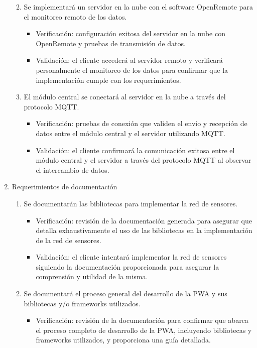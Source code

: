 \documentclass[
11pt, %
]{charter}
\begin{document}
\begin{enumerate}
\begin{enumerate}
\begin{itemize}
			\end{itemize}
			\item Se implementará un servidor en la nube con el software OpenRemote para el monitoreo remoto de los datos.
			\begin{itemize}
				\item Verificación: configuración exitosa del servidor en la nube con OpenRemote y pruebas de transmisión de datos.
				\item Validación: el cliente accederá al servidor remoto y verificará personalmente el monitoreo de los datos para confirmar que la implementación cumple con los requerimientos.
			\end{itemize}
			\item El módulo central se conectará al servidor en la nube a través del protocolo MQTT.
			\begin{itemize}
				\item Verificación: pruebas de conexión que validen el envío y recepción de datos entre el módulo central y el servidor utilizando MQTT.
				\item Validación: el cliente confirmará la comunicación exitosa entre el módulo central y el servidor a través del protocolo MQTT al observar el intercambio de datos.
			\end{itemize}
		\end{enumerate}
	\item Requerimientos de documentación
		\begin{enumerate}
			\item Se documentarán las bibliotecas para implementar la red de sensores.
			\begin{itemize}
				\item Verificación: revisión de la documentación generada para asegurar que detalla exhaustivamente el uso de las bibliotecas en la implementación de la red de sensores.
				\item Validación: el cliente intentará implementar la red de sensores siguiendo la documentación proporcionada para asegurar la comprensión y utilidad de la misma.
			\end{itemize} 
			\item Se documentará el proceso general del desarrollo de la PWA y sus bibliotecas y/o frameworks utilizados.
			\begin{itemize}
				\item Verificación: revisión de la documentación para confirmar que abarca el proceso completo de desarrollo de la PWA, incluyendo bibliotecas y frameworks utilizados, y proporciona una guía detallada.

\end{itemize}
\end{enumerate}
\end{enumerate}
\end{document}
